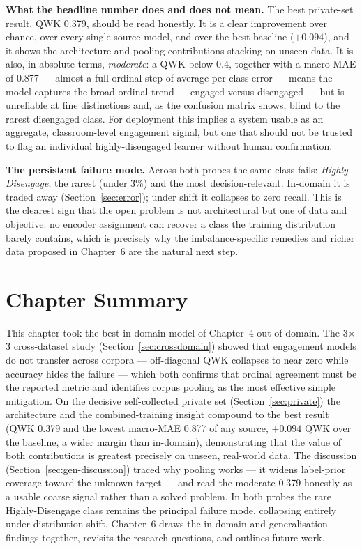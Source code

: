 \documentclass[../main.tex]{subfiles}
\begin{document}
\textbf{What the headline number does and does not mean.}
The best private-set result, QWK 0.379, should be read honestly.
It is a clear improvement over chance, over every single-source model, and over the best baseline ($+0.094$), and it shows the architecture and pooling contributions stacking on unseen data.
It is also, in absolute terms, \emph{moderate}: a QWK below 0.4, together with a macro-MAE of 0.877 --- almost a full ordinal step of average per-class error --- means the model captures the broad ordinal trend --- engaged versus disengaged --- but is unreliable at fine distinctions and, as the confusion matrix shows, blind to the rarest disengaged class.
For deployment this implies a system usable as an aggregate, classroom-level engagement signal, but one that should not be trusted to flag an individual highly-disengaged learner without human confirmation.

\textbf{The persistent failure mode.}
Across both probes the same class fails: \emph{Highly\nobreakdash-Disengage}, the rarest (under 3\%) and the most decision-relevant.
In-domain it is traded away (Section~\ref{sec:error}); under shift it collapses to zero recall.
This is the clearest sign that the open problem is not architectural but one of data and objective: no encoder assignment can recover a class the training distribution barely contains, which is precisely why the imbalance-specific remedies and richer data proposed in Chapter~6 are the natural next step.

\FloatBarrier
\section{Chapter Summary}
\label{sec:gen-summary}

This chapter took the best in-domain model of Chapter~4 out of domain.
The 3$\times$3 cross-dataset study (Section~\ref{sec:crossdomain}) showed that engagement models do not transfer across corpora --- off-diagonal QWK collapses to near zero while accuracy hides the failure --- which both confirms that ordinal agreement must be the reported metric and identifies corpus pooling as the most effective simple mitigation.
On the decisive self-collected private set (Section~\ref{sec:private}) the architecture and the combined-training insight compound to the best result (QWK 0.379 and the lowest macro-MAE 0.877 of any source, $+0.094$ QWK over the baseline, a wider margin than in-domain), demonstrating that the value of both contributions is greatest precisely on unseen, real-world data.
The discussion (Section~\ref{sec:gen-discussion}) traced why pooling works --- it widens label-prior coverage toward the unknown target --- and read the moderate 0.379 honestly as a usable coarse signal rather than a solved problem.
In both probes the rare Highly\nobreakdash-Disengage class remains the principal failure mode, collapsing entirely under distribution shift.
Chapter~6 draws the in-domain and generalisation findings together, revisits the research questions, and outlines future work.
\end{document}
